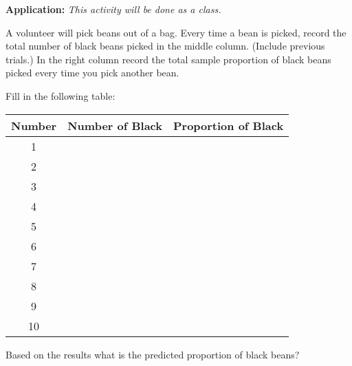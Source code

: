 
\begin{problem}

\item \textbf{Application:} \textit{This activity will be done as a
    class.}

  A volunteer will pick beans out of a bag. Every time a bean is
  picked, record the total number of black beans picked in the middle
  column. (Include previous trials.) In the right column record the
  total sample proportion of black beans picked every time you pick
  another bean.

\item Fill in the following table:

  \begin{tabular}{| c | c | r |}
    \hline 
    Number & Number of Black & Proportion of Black \\  \hline 
    1 &  & \\  [12pt] \hline 
    2 & & \\  [12pt] \hline 
    3 & & \\  [12pt] \hline 
    4 & & \\  [12pt]  \hline 
    5 & & \\  [12pt] \hline 
    6 & & \\  [12pt] \hline 
    7 & & \\  [12pt] \hline 
    8 & & \\  [12pt] \hline 
    9 & & \\  [12pt] \hline 
    10 & & \\  [12pt] \hline 
  \end{tabular}

\item Based on the results what is the predicted proportion of black beans? 


\end{problem}
 
 
